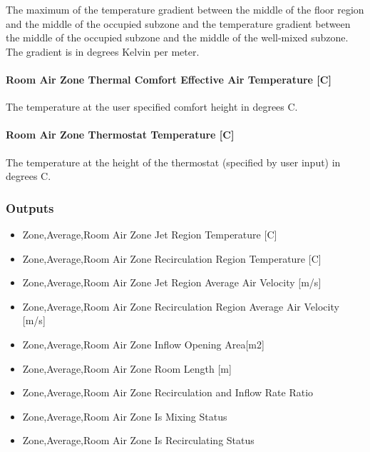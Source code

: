 The maximum of the temperature gradient between the middle of the floor region and the middle of the occupied subzone and the temperature gradient between the middle of the occupied subzone and the middle of the well-mixed subzone. The gradient is in degrees Kelvin per meter.

\paragraph{Room Air Zone Thermal Comfort Effective Air Temperature {[}C{]}}\label{room-air-zone-thermal-comfort-effective-air-temperature-c}

The temperature at the user specified comfort height in degrees C.

\paragraph{Room Air Zone Thermostat Temperature {[}C{]}}\label{room-air-zone-thermostat-temperature-c}

The temperature at the height of the thermostat (specified by user input) in degrees C.

\subsubsection{Outputs}\label{outputs-5-009}

\begin{itemize}
\item
  Zone,Average,Room Air Zone Jet Region Temperature {[}C{]}
\item
  Zone,Average,Room Air Zone Recirculation Region Temperature {[}C{]}
\item
  Zone,Average,Room Air Zone Jet Region Average Air Velocity {[}m/s{]}
\item
  Zone,Average,Room Air Zone Recirculation Region Average Air Velocity {[}m/s{]}
\item
  Zone,Average,Room Air Zone Inflow Opening Area{[}m2{]}
\item
  Zone,Average,Room Air Zone Room Length {[}m{]}
\item
  Zone,Average,Room Air Zone Recirculation and Inflow Rate Ratio \protect\hyperlink{section-1}{}
\item
  Zone,Average,Room Air Zone Is Mixing Status \protect\hyperlink{section-1}{}
\item
  Zone,Average,Room Air Zone Is Recirculating Status \protect\hyperlink{section-1}{}
\end{itemize}

